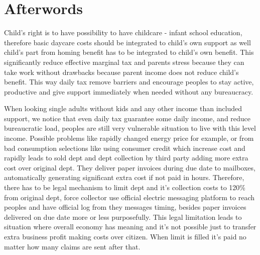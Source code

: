 %
%
%
\chapter{Afterwords}
\label{afterwords}
Child's right\allowbreak\cite{ChildProtectionCrisis}
is to have possibility to have childcare - infant school education, therefore
basic daycare costs should be integrated to child's own support as well
child's part from homing benefit has to be integrated to child's own
benefit\allowbreak\cite{VN_2025_22}. This significantly reduce effective
marginal tax and parents stress because they can take work without drawbacks
because parent income does not reduce child's benefit. This way daily tax
remove barriers and encourage peoples to stay active, productive and give
support immediately when needed without any bureaucracy.

When looking single adults without kids and any other income than included
support, we notice that even daily tax guarantee some daily income, and reduce
bureaucratic load, peoples are still very vulnerable situation to live with
this level income. Possible problems like rapidly changed energy price for
example, or from bad consumption selections like using consumer credit which
increase cost and rapidly leads to sold dept and dept collection by third
party adding more extra cost over original dept. They deliver paper invoices
during due date to mailboxes, automatically generating significant extra cost
if not paid in hours. Therefore, there has to be legal mechanism
to limit dept and it's collection costs to 120\% from original dept, force
collector use official electric messaging platform to reach peoples and have
official log from they messages timing, besides paper invoices delivered on
due date more or less purposefully. This legal limitation leads to situation
where overall economy has meaning and it's not possible just to transfer extra
business profit making costs over citizen. When limit is filled it's paid no
matter how many claims are sent after that.
